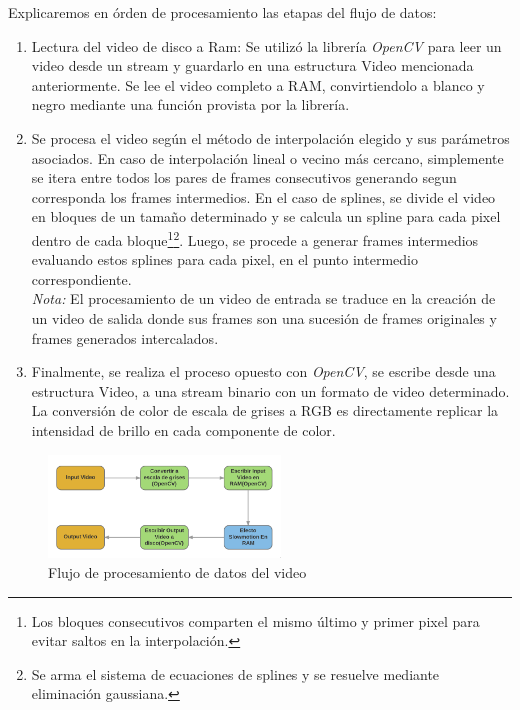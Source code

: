 Explicaremos en órden de procesamiento las etapas del flujo de datos:
\begin{enumerate}
	\item Lectura del video de disco a Ram: Se utilizó la librería \emph{OpenCV} para leer un video desde un stream y guardarlo en una estructura Video mencionada anteriormente. Se lee el video completo a RAM, convirtiendolo a blanco y negro mediante una función provista por la librería.
	\item Se procesa el video según el método de interpolación elegido y sus parámetros asociados. En caso de interpolación lineal o vecino más cercano, simplemente se itera entre todos los pares de frames consecutivos generando segun corresponda los frames intermedios. En el caso de splines, se divide el video en bloques de un tamaño determinado y se calcula un spline para cada pixel dentro de cada bloque\footnote{Los bloques consecutivos comparten el mismo último y primer pixel para evitar saltos en la interpolación.}\footnote{Se arma el sistema de ecuaciones de splines y se resuelve mediante eliminación gaussiana.}. Luego, se procede a generar frames intermedios evaluando estos splines para cada pixel, en el punto intermedio correspondiente.\\
	\emph{Nota:} El procesamiento de un video de entrada se traduce en la creación de un video de salida donde sus frames son una sucesión de frames originales y frames generados intercalados.
	\item Finalmente, se realiza el proceso opuesto con \emph{OpenCV}, se escribe desde una estructura Video, a una stream binario con un formato de video determinado. La conversión de color de escala de grises a RGB es directamente replicar la intensidad de brillo en cada componente de color.
\end{enumerate}

\begin{figure}[h!]
  \begin{centering}
    \includegraphics[width=0.55\textwidth]{img/dataflow.png}
     \caption{Flujo de procesamiento de datos del video}\label{fig:dataflow}
 \end{centering}
\end{figure}

